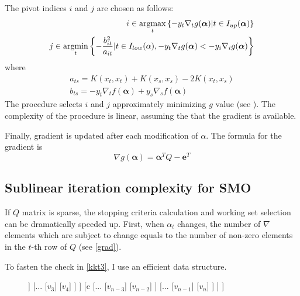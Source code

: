 The pivot indices $i$ and $j$ are chosen as follows:
\begin{eqnarray}
i \in \underset{t}{\operatorname{argmax}}
\left\{ -y_t \nabla_t g(\bm{\alpha}) | t \in I_{up}(\bm{\alpha}) \right\} \\
j \in \underset{t}{\operatorname{argmin}}
\left\{
-\frac{b_{it}^2}{a_{it}}| t \in I_{low} (\alpha), 
-y_t \nabla_t g(\bm{\alpha}) < -y_i \nabla_i g(\bm{\alpha})
\right\}
\end{eqnarray}
where
\begin{eqnarray}
a_{ts} = K(x_t, x_t) + K(x_s, x_s) - 2 K(x_t, x_s) \\ 
b_{ts} = -y_t \nabla_t f(\bm{\alpha}) + y_s \nabla_s f(\bm{\alpha})
\end{eqnarray}
The procedure selects $i$ and $j$ approximately minimizing $g$ value (see \cite{chang2011libsvm}). The complexity of the procedure is linear, assuming the that the gradient is available.

Finally, gradient is updated after each modification of $\alpha$. The formula for the gradient is
\begin{equation}
\nabla g(\bm{\alpha}) = \bm{\alpha}^T Q - \bm{e}^T
\label{grad}
\end{equation}

\subsection{Sublinear iteration complexity for SMO}
If $Q$ matrix is sparse, the stopping criteria calculation and working set selection can be dramatically speeded up. First, when $\alpha_t$ changes, the number of $\nabla$ elements which are subject to change equals to the number of non-zero elements in the $t$-th row of $Q$ (see \ref{grad}). 

To fasten the check in \ref{kkt3}, I use an efficient data structure.

\begin{figure}
\centering
\begin{forest}
[a
	[b
		[...
			[$v_1$]
			[$v_2$]
		]
		[...
			[$v_3$]
			[$v_4$]
		]
	]
	[c
		[...
			[$v_{n-3}$]
			[$v_{n-2}$]
		]
		[...
			[$v_{n-1}$]
			[$v_{n}$]
		]
	]
]
\end{forest}
\end{figure}

